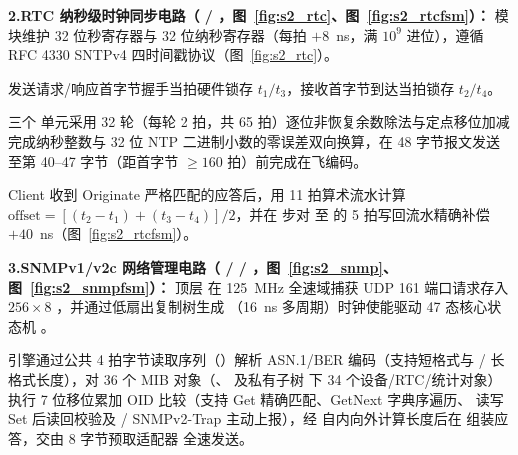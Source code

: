 
\noindent \textbf{2.\quad RTC 纳秒级时钟同步电路（ / ，图~\ref{fig:s2_rtc}、图~\ref{fig:s2_rtcfsm}）：}
模块维护 32 位秒寄存器与 32 位纳秒寄存器（每拍 $+8$~ns，满 $10^9$ 进位），遵循 RFC 4330 SNTPv4 四时间戳协议（图~\ref{fig:s2_rtc}）。


发送请求/响应首字节握手当拍硬件锁存 $t_1/t_3$，接收首字节到达当拍锁存 $t_2/t_4$。

三个  单元采用 32 轮（每轮 2 拍，共 65 拍）逐位非恢复余数除法与定点移位加减完成纳秒整数与 32 位 NTP 二进制小数的零误差双向换算，在 48 字节报文发送至第 40--47 字节（距首字节 $\ge 160$ 拍）前完成在飞编码。


Client 收到 Originate 严格匹配的应答后，用 11 拍算术流水计算 $\text{offset}=[(t_2-t_1)+(t_3-t_4)]/2$，并在  步对  至  的 5 拍写回流水精确补偿 $+40$~ns（图~\ref{fig:s2_rtcfsm}）。

\noindent \textbf{3.\quad SNMPv1/v2c 网络管理电路（ /  / ，图~\ref{fig:s2_snmp}、图~\ref{fig:s2_snmpfsm}）：}
顶层  在 125~MHz 全速域捕获 UDP 161 端口请求存入 $256\times 8$ ，并通过低扇出复制树生成 （16~ns 多周期）时钟使能驱动 47 态核心状态机 。


引擎通过公共 4 拍字节读取序列（）解析 ASN.1/BER 编码（支持短格式与 / 长格式长度），对 36 个 MIB 对象（、 及私有子树  下 34 个设备/RTC/统计对象）执行 7 位移位累加 OID 比较（支持 Get 精确匹配、GetNext 字典序遍历、 读写 Set 后读回校验及 / SNMPv2-Trap 主动上报），经  自内向外计算长度后在  组装应答，交由 8 字节预取适配器  全速发送。

